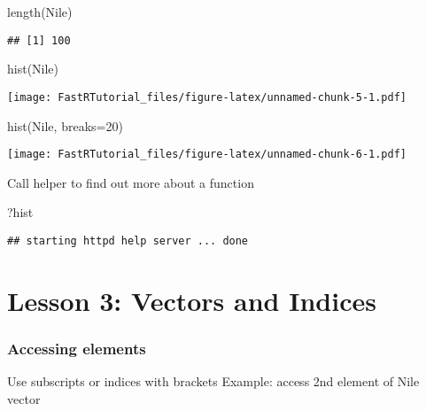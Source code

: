 \documentclass[
]{article}
\newenvironment{Shaded}{\begin{snugshade}}{\end{snugshade}}
\newcommand{\AttributeTok}[1]{\textcolor[rgb]{0.77,0.63,0.00}{#1}}
\newcommand{\DecValTok}[1]{\textcolor[rgb]{0.00,0.00,0.81}{#1}}
\newcommand{\FunctionTok}[1]{\textcolor[rgb]{0.00,0.00,0.00}{#1}}
\newcommand{\NormalTok}[1]{#1}
\begin{document}
\begin{Shaded}
\begin{Highlighting}[]
\FunctionTok{length}\NormalTok{(Nile)}
\end{Highlighting}
\end{Shaded}

\begin{verbatim}
## [1] 100
\end{verbatim}

\begin{Shaded}
\begin{Highlighting}[]
\FunctionTok{hist}\NormalTok{(Nile)}
\end{Highlighting}
\end{Shaded}

\texttt{[image: FastRTutorial\_files/figure-latex/unnamed-chunk-5-1.pdf]}

\begin{Shaded}
\begin{Highlighting}[]
\FunctionTok{hist}\NormalTok{(Nile, }\AttributeTok{breaks=}\DecValTok{20}\NormalTok{)}
\end{Highlighting}
\end{Shaded}

\texttt{[image: FastRTutorial\_files/figure-latex/unnamed-chunk-6-1.pdf]}

Call helper to find out more about a function

\begin{Shaded}
\begin{Highlighting}[]
\NormalTok{?hist}
\end{Highlighting}
\end{Shaded}

\begin{verbatim}
## starting httpd help server ... done
\end{verbatim}

\hypertarget{lesson-3-vectors-and-indices}{%
\section{Lesson 3: Vectors and
Indices}\label{lesson-3-vectors-and-indices}}

\hypertarget{accessing-elements}{%
\subsubsection{Accessing elements}\label{accessing-elements}}

Use subscripts or indices with brackets Example: access 2nd element of
Nile vector
\end{document}
